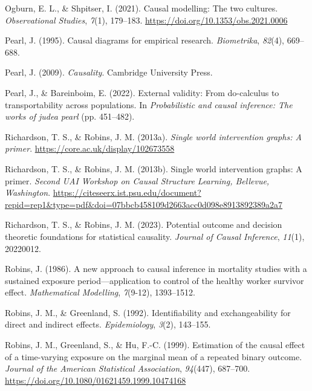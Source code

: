 \documentclass[
  single column]{article}
\newlength{\cslhangindent}
\newenvironment{CSLReferences}[2] %
 {\begin{list}{}{%
  \setlength{\itemindent}{0pt}
  \setlength{\leftmargin}{0pt}
  \setlength{\parsep}{0pt}
  \ifodd #1
   \setlength{\leftmargin}{\cslhangindent}
   \setlength{\itemindent}{-1\cslhangindent}
  \fi
  \setlength{\itemsep}{#2\baselineskip}}}
 {\end{list}}
\begin{document}
\begin{CSLReferences}{1}{0}
Ogburn, E. L., \& Shpitser, I. (2021). Causal modelling: The two
cultures. \emph{Observational Studies}, \emph{7}(1), 179--183.
\url{https://doi.org/10.1353/obs.2021.0006}

Pearl, J. (1995). Causal diagrams for empirical research.
\emph{Biometrika}, \emph{82}(4), 669--688.

Pearl, J. (2009). \emph{Causality}. Cambridge University Press.

Pearl, J., \& Bareinboim, E. (2022). External validity: From do-calculus
to transportability across populations. In \emph{Probabilistic and
causal inference: The works of judea pearl} (pp. 451--482).

Richardson, T. S., \& Robins, J. M. (2013a). \emph{Single world
intervention graphs: A primer}.
\url{https://core.ac.uk/display/102673558}

Richardson, T. S., \& Robins, J. M. (2013b). Single world intervention
graphs: A primer. \emph{Second UAI Workshop on Causal Structure
Learning, {B}ellevue, {W}ashington}.
\url{https://citeseerx.ist.psu.edu/document?repid=rep1&type=pdf&doi=07bbcb458109d2663acc0d098e8913892389a2a7}

Richardson, T. S., \& Robins, J. M. (2023). Potential outcome and
decision theoretic foundations for statistical causality. \emph{Journal
of Causal Inference}, \emph{11}(1), 20220012.

Robins, J. (1986). A new approach to causal inference in mortality
studies with a sustained exposure period---application to control of the
healthy worker survivor effect. \emph{Mathematical Modelling},
\emph{7}(9-12), 1393--1512.

Robins, J. M., \& Greenland, S. (1992). Identifiability and
exchangeability for direct and indirect effects. \emph{Epidemiology},
\emph{3}(2), 143--155.

Robins, J. M., Greenland, S., \& Hu, F.-C. (1999). Estimation of the
causal effect of a time-varying exposure on the marginal mean of a
repeated binary outcome. \emph{Journal of the American Statistical
Association}, \emph{94}(447), 687--700.
\url{https://doi.org/10.1080/01621459.1999.10474168}


\end{CSLReferences}
\end{document}
